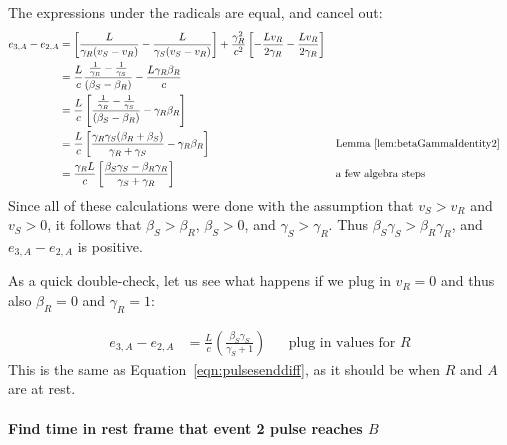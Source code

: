 \documentclass[a4paper]{article}
\theoremstyle{plain}
\theoremstyle{definition}
\begin{document}
The expressions under the radicals are equal, and cancel out:
\begin{align*}
e_{3,A}-e_{2,A}
  & = \left[ \frac{L}{\gamma_R(v_S - v_R)} - \frac{L}{\gamma_S(v_S - v_R)} \right] + \frac{\gamma_R^2}{c^2} \left[ -\frac{Lv_R}{2\gamma_R} - \frac{Lv_R}{2\gamma_R} \right] \\
  & = \frac{L}{c} \frac{\frac{1}{\gamma_R} - \frac{1}{\gamma_S}}{(\beta_S - \beta_R)} - \frac{L\gamma_R\beta_R}{c} \\
  & = \frac{L}{c} \left[ \frac{\frac{1}{\gamma_R} - \frac{1}{\gamma_S}}{(\beta_S - \beta_R)} - \gamma_R\beta_R \right] \\
  & = \frac{L}{c} \left[ \frac{\gamma_R\gamma_S(\beta_R+\beta_S)}{\gamma_R+\gamma_S} - \gamma_R\beta_R \right] & & \text{Lemma~\ref{lem:betaGammaIdentity2}} \\
  & = \frac{\gamma_R L}{c} \left[ \frac{\beta_S\gamma_S - \beta_R\gamma_R}{\gamma_S + \gamma_R} \right] & & \text{a few algebra steps}
\end{align*}
Since all of these calculations were done with the assumption that
$v_S > v_R$ and $v_S > 0$, it follows that $\beta_S > \beta_R$,
$\beta_S > 0$, and $\gamma_S > \gamma_R$.  Thus
$\beta_S\gamma_S > \beta_R\gamma_R$, and $e_{3,A}-e_{2,A}$ is positive.

As a quick double-check, let us see what happens if we plug in $v_R=0$
and thus also $\beta_R=0$ and $\gamma_R=1$:

\begin{align*}
e_{3,A}-e_{2,A}
  & = \frac{L}{c} \left( \frac{\beta_S\gamma_S}{\gamma_S + 1} \right) & & \text{plug in values for $R$}
\end{align*}
This is the same as Equation~\eqref{eqn:pulsesenddiff}, as it should
be when $R$ and $A$ are at rest.


\paragraph{Find time in rest frame that event 2 pulse reaches $B$}
\end{document}
